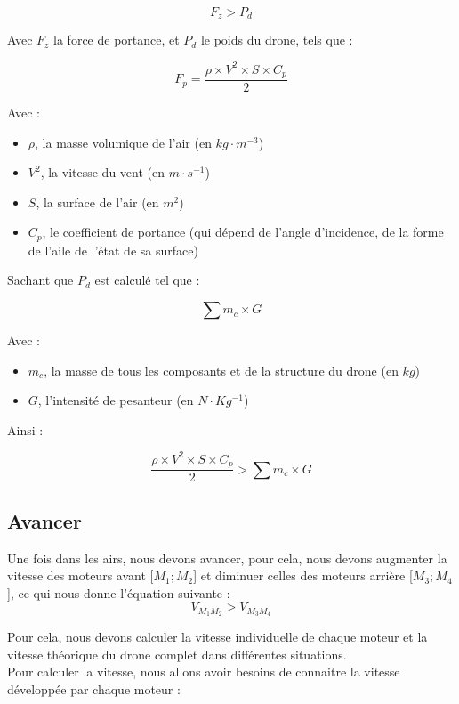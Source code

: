 \documentclass{rapport}
\begin{document}
$$ F_z > P_d $$

Avec $F_z$ la force de portance, et $P_d$ le poids du drone, tels que :

$$F_p=\frac{\rho\times V^2 \times S \times C_p}{2}$$

Avec :
\begin{itemize}
    \item $\rho$, la masse volumique de l'air (en $kg \cdot m^{-3}$)
    \item $V^2$, la vitesse du vent (en $m \cdot s^{-1}$)
    \item $S$, la surface de l'air (en $m^2$)
    \item $C_p$, le coefficient de portance (qui dépend de l'angle d'incidence, de la forme de l'aile de l'état de sa surface) \\
\end{itemize}

Sachant que $P_d$ est calculé tel que :

$$\sum m_c \times G$$

Avec :

\begin{itemize}
    \item $m_c$, la masse de tous les composants et de la structure du drone (en $kg$)
    \item $G$, l'intensité de pesanteur (en $N \cdot Kg^{-1}$) \\
\end{itemize}

Ainsi :

$$\frac{\rho\times V^2 \times S \times C_p}{2} > \sum m_c \times G$$

\subsection{Avancer}
Une fois dans les airs, nous devons avancer, pour cela, nous devons augmenter la vitesse des moteurs avant [$M_1; M_2$] et diminuer celles des moteurs arrière [$M_3; M_4$], ce qui nous donne l'équation suivante : \\

$$ V_{M_1M_2} > V_{M_3M_4}$$

Pour cela, nous devons calculer la vitesse individuelle de chaque moteur et la vitesse théorique du drone complet dans différentes situations. \\

Pour calculer la vitesse, nous allons avoir besoins de connaitre la vitesse développée par chaque moteur :
\end{document}
